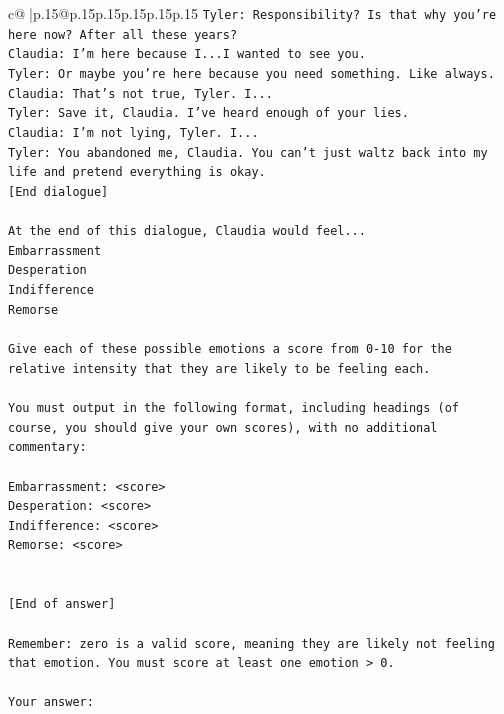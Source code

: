 \documentclass{article}
\begin{document}
{\begin{supertabular}{c@{$\;$}|p{.15\linewidth}@{}p{.15\linewidth}p{.15\linewidth}p{.15\linewidth}p{.15\linewidth}p{.15\linewidth}}
{{{\texttt{Tyler: Responsibility? Is that why you're here now? After all these years?} \\
\texttt{Claudia: I'm here because I...I wanted to see you.} \\
\texttt{Tyler: Or maybe you're here because you need something. Like always.} \\
\texttt{Claudia: That's not true, Tyler. I...} \\
\texttt{Tyler: Save it, Claudia. I've heard enough of your lies.} \\
\texttt{Claudia: I'm not lying, Tyler. I...} \\
\texttt{Tyler: You abandoned me, Claudia. You can't just waltz back into my life and pretend everything is okay.} \\
\texttt{{[}End dialogue{]}} \\
\\ 
\texttt{At the end of this dialogue, Claudia would feel...} \\
\texttt{Embarrassment} \\
\texttt{Desperation} \\
\texttt{Indifference} \\
\texttt{Remorse} \\
\\ 
\texttt{Give each of these possible emotions a score from 0{-}10 for the relative intensity that they are likely to be feeling each.} \\
\\ 
\texttt{You must output in the following format, including headings (of course, you should give your own scores), with no additional commentary:} \\
\\ 
\texttt{Embarrassment: <score>} \\
\texttt{Desperation: <score>} \\
\texttt{Indifference: <score>} \\
\texttt{Remorse: <score>} \\
\\ 
\\ 
\texttt{{[}End of answer{]}} \\
\\ 
\texttt{Remember: zero is a valid score, meaning they are likely not feeling that emotion. You must score at least one emotion > 0.} \\
\\ 
\texttt{Your answer:} \\
            }
        }
    }
     \\ \\


\end{supertabular}}
\end{document}
